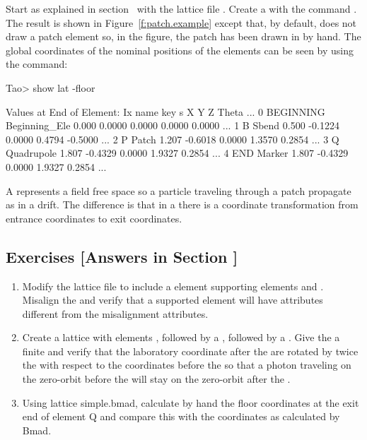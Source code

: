 \documentclass{hitec}     %
\begin{document}
Start \tao as explained in section~ with the lattice file . Create a
 with the command . The result is shown in
Figure~\ref{f:patch.example} except that, by default, \tao does not draw a patch element so, in the
figure, the patch has been drawn in by hand. The global coordinates of the nominal positions of the
elements can be seen by using the  command:
\begin{code}
Tao> show lat -floor

      Values at End of Element:
Ix  name      key               s          X         Y         Z     Theta ...
 0  BEGINNING Beginning_Ele  0.000    0.0000    0.0000    0.0000    0.0000 ...
 1  B         Sbend          0.500   -0.1224    0.0000    0.4794   -0.5000 ...
 2  P         Patch          1.207   -0.6018    0.0000    1.3570    0.2854 ...
 3  Q         Quadrupole     1.807   -0.4329    0.0000    1.9327    0.2854 ...
 4  END       Marker         1.807   -0.4329    0.0000    1.9327    0.2854 ...
\end{code}

A  represents a field free space so a particle traveling through a patch propagate as in a
drift. The difference is that in a  there is a coordinate transformation from entrance
coordinates to exit coordinates.

\subsection{Exercises [Answers in Section ]}
\label{s:coords.ex}

\begin{enumerate}[label=\thesection.\arabic{enumi}]
\item
Modify the lattice file  to include a  element supporting elements 
and . Misalign the  and verify that a supported element will have 
attributes different from the misalignment attributes.
%
\item
Create a lattice with elements , followed by a , followed by a .
Give the  a finite  and verify that the laboratory coordinate after the
 are rotated by twice the  with respect to the coordinates before the
 so that a photon traveling on the zero-orbit before the  will stay on the
zero-orbit after the .
%
\item
Using lattice simple.bmad, calculate by hand the floor coordinates at the exit end of element Q and compare this with the coordinates as calculated by Bmad.
\end{enumerate}
\end{document}
